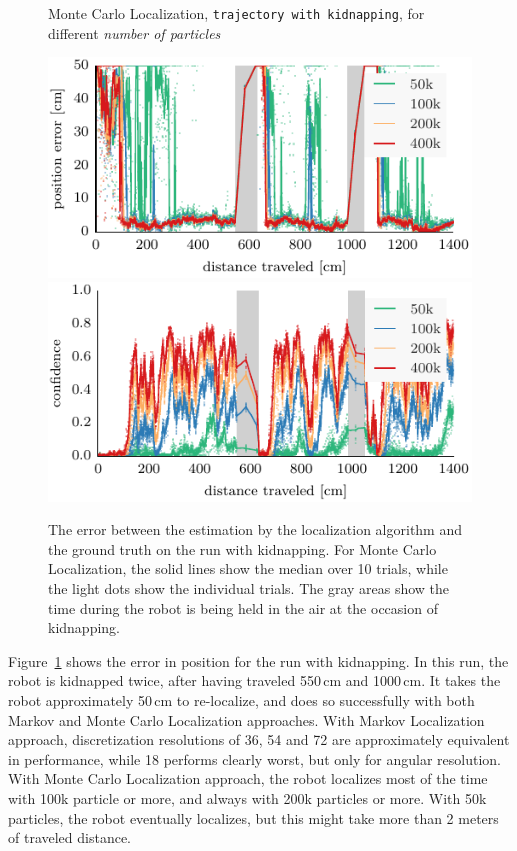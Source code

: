 \documentclass[letterpaper, 10pt, conference]{ieeeconf}
\newcommand{\Fig}[1]{Figure~\ref{fig:#1}}
\begin{document}
\begin{figure}
\begin{center}
Monte Carlo Localization, \texttt{trajectory with kidnapping}, for different \emph{number of particles}
\end{center}
\includegraphics{mcl-whole_random_long-xy}
\includegraphics{mcl-whole_random_long-conf}

\caption{The error between the estimation by the localization algorithm and the ground truth on the run with kidnapping.
For Monte Carlo Localization, the solid lines show the median over 10 trials, while the light dots show the individual trials.
The gray areas show the time during the robot is being held in the air at the occasion of kidnapping.}
\label{fig:whole-runs-random-long}
\end{figure}

\Fig{whole-runs-random-long} shows the error in position for the run with kidnapping.
In this run, the robot is kidnapped twice, after having traveled 550\,cm and 1000\,cm.
It takes the robot approximately 50\,cm to re-localize, and does so successfully with both Markov and Monte Carlo Localization approaches.
With Markov Localization approach, discretization resolutions of 36, 54 and 72 are approximately equivalent in performance, while 18 performs clearly worst, but only for angular resolution.
With Monte Carlo Localization approach, the robot localizes most of the time with 100k particle or more, and always with 200k particles or more.
With 50k particles, the robot eventually localizes, but this might take more than 2 meters of traveled distance.
\end{document}
